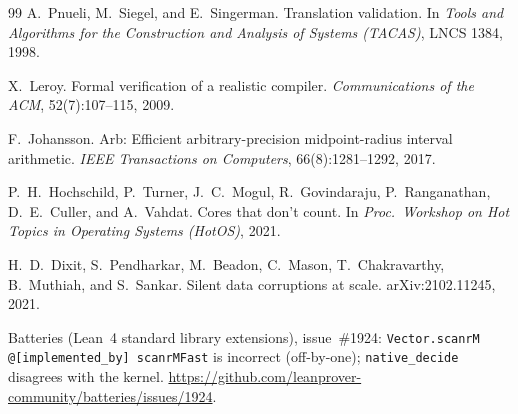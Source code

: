 \documentclass[11pt]{article}
\theoremstyle{definition}
\theoremstyle{plain}
\theoremstyle{remark}
\begin{document}
\begin{thebibliography}{99}
 A.~Pnueli, M.~Siegel, and E.~Singerman.
  Translation validation.
  In \emph{Tools and Algorithms for the Construction and Analysis of Systems (TACAS)}, LNCS 1384, 1998.

 X.~Leroy.
  Formal verification of a realistic compiler.
  \emph{Communications of the ACM}, 52(7):107--115, 2009.

 F.~Johansson.
  Arb: Efficient arbitrary-precision midpoint-radius interval arithmetic.
  \emph{IEEE Transactions on Computers}, 66(8):1281--1292, 2017.

 P.~H.~Hochschild, P.~Turner, J.~C.~Mogul, R.~Govindaraju, P.~Ranganathan,
  D.~E.~Culler, and A.~Vahdat.
  Cores that don't count.
  In \emph{Proc.\ Workshop on Hot Topics in Operating Systems (HotOS)}, 2021.

 H.~D.~Dixit, S.~Pendharkar, M.~Beadon, C.~Mason, T.~Chakravarthy, B.~Muthiah,
  and S.~Sankar.
  Silent data corruptions at scale.
  arXiv:2102.11245, 2021.

 Batteries (Lean~4 standard library extensions), issue~\#1924:
  \texttt{Vector.scanrM} \texttt{@[implemented\_by] scanrMFast} is incorrect (off-by-one);
  \texttt{native\_decide} disagrees with the kernel.
  \url{https://github.com/leanprover-community/batteries/issues/1924}.

\end{thebibliography}
\end{document}
